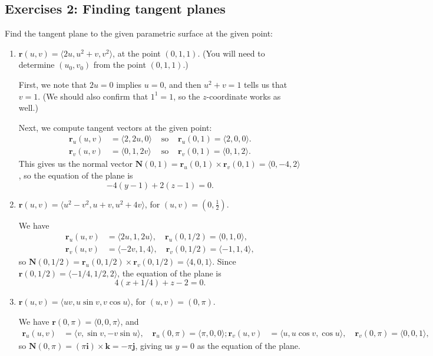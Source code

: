 \documentclass[12pt,letterpaper]{article}
\renewcommand{\r}{\mathbf{r}}
\renewcommand{\i}{\mathbf{i}}
\renewcommand{\j}{\mathbf{j}}
\renewcommand{\k}{\mathbf{k}}
\newcommand{\N}{\mathbf{N}}
\begin{document}
\subsection{Exercises 2: Finding tangent planes}
Find the tangent plane to the given parametric surface at the given point:
\begin{enumerate}
 \item $\r(u,v) = \langle 2u, u^2+v, v^2\rangle$, at the point $(0,1,1)$. (You will need to determine $(u_0,v_0)$ from the point $(0,1,1)$.)

\bigskip

First, we note that $2u=0$ implies $u=0$, and then $u^2+v=1$ tells us that $v=1$. (We should also confirm that $1^1=1$, so the $z$-coordinate works as well.)

Next, we compute tangent vectors at the given point:
\begin{align*}
 \r_u(u,v) & = \langle 2, 2u, 0\rangle & \text{ so } & \r_u(0,1) = \langle 2, 0, 0\rangle.\\
 \r_v(u,v) & = \langle 0,1,2v\rangle & \text { so } & \r_v(0,1) = \langle 0,1,2\rangle.
\end{align*}
This gives us the normal vector $\N(0,1) = \r_u(0,1)\times \r_v(0,1) = \langle 0,-4,2\rangle$, so the equation of the plane is
\[
 -4(y-1)+2(z-1)=0.
\]


 \item $\r(u,v) = \langle u^2-v^2, u+v, u^2+4v\rangle$, for $(u,v)=(0,\frac{1}{2})$.

\bigskip

We have
\begin{align*}
 \r_u(u,v) & = \langle 2u,1,2u\rangle, \quad \r_u(0, 1/2) = \langle 0, 1, 0\rangle,\\
 \r_v(u,v) & = \langle -2v, 1, 4\rangle, \quad \r_v(0,1/2) = \langle -1, 1, 4\rangle,
\end{align*}
so $\N(0,1/2) = \r_u(0,1/2)\times\r_v(0,1/2) = \langle 4, 0, 1\rangle$. Since $\r(0,1/2) = \langle -1/4, 1/2, 2\rangle$, the equation of the plane is
\[
 4(x+1/4)+z-2 = 0.
\]


 \item $\r(u,v) = \langle uv, u\sin v, v\cos u\rangle$, for $(u,v) = (0,\pi)$.

\bigskip

We have $\r(0,\pi) = \langle 0, 0, \pi\rangle$, and
\begin{align*}
 \r_u(u,v) & = \langle v, \sin v, -v\sin u\rangle, \quad \r_u(0,\pi) = \langle \pi, 0, 0\rangle;
 \r_v(u,v) & = \langle u, u\cos v, \cos u\rangle, \quad \r_v(0,\pi) = \langle 0, 0, 1\rangle,
\end{align*}
so $\N(0,\pi) = (\pi \i)\times \k = -\pi \j$, giving us $y=0$ as the equation of the plane.

\end{enumerate}
\end{document}
